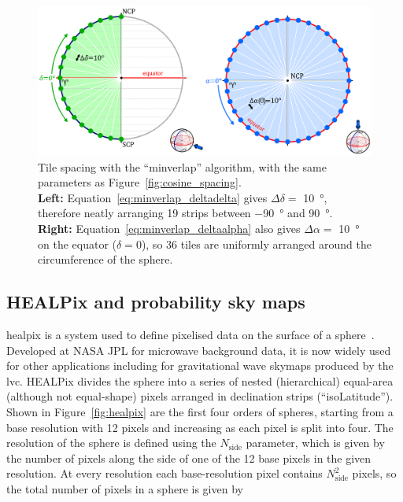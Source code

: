 \begin{colsection}
\begin{colsection}
\begin{figure}[p]
\begin{center}
\includegraphics[width=\linewidth]{images/spacing_minverlap.pdf}
\end{center}
\caption[Tile spacing with the ``minverlap'' algorithm]{Tile spacing with the ``minverlap'' algorithm, with the same parameters as Figure~\ref{fig:cosine_spacing}.
\\
\textbf{Left:} Equation~\ref{eq:minverlap_deltadelta} gives $\Delta\delta = $ \SI{10}{\degree}, therefore neatly arranging 19 strips between \SI{-90}{\degree} and \SI{90}{\degree}.
\\
\textbf{Right:} Equation~\ref{eq:minverlap_deltaalpha} also gives $\Delta\alpha = $ \SI{10}{\degree} on the equator ($\delta=0$), so 36 tiles are uniformly arranged around the circumference of the sphere.
}
\label{fig:minverlap_spacing}
\end{figure}

\newpage

\end{colsection}


\subsection{HEALPix and probability sky maps}
\label{sec:skymaps}
\begin{colsection}

\gls{healpix} is a system used to define pixelised data on the surface of a sphere~\citep{HEALPix}. Developed at NASA JPL for microwave background data, it is now widely used for other applications including for gravitational wave skymaps produced by the \gls{lvc}. HEALPix divides the sphere into a series of nested (hierarchical) equal-area (although not equal-shape) pixels arranged in declination strips (``isoLatitude''). Shown in Figure~\ref{fig:healpix} are the first four orders of spheres, starting from a base resolution with 12 pixels and increasing as each pixel is split into four. The resolution of the sphere is defined using the $N_\text{side}$ parameter, which is given by the number of pixels along the side of one of the 12 base pixels in the given resolution. At every resolution each base-resolution pixel contains $N_\text{side}^2$ pixels, so the total number of pixels in a sphere is given by


\end{colsection}
\end{colsection}
